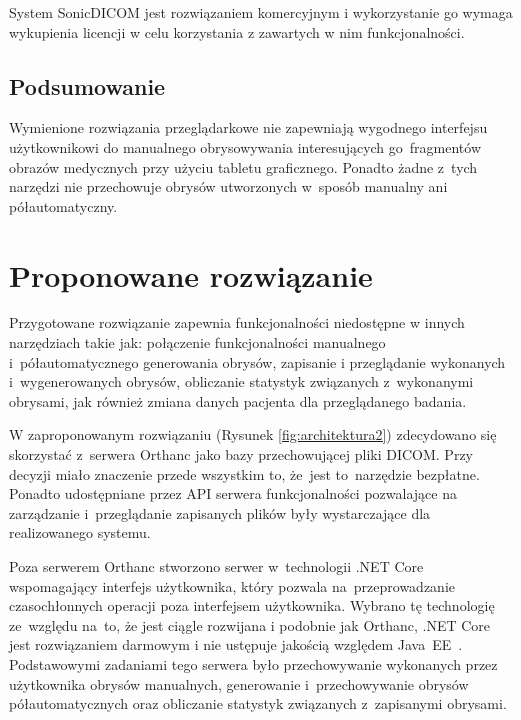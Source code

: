 \documentclass[a4paper,11pt,twoside,openright]{report}
\theoremstyle{definition}
\begin{document}
System SonicDICOM jest rozwiązaniem komercyjnym i wykorzystanie go wymaga wykupienia
licencji w celu korzystania z zawartych w nim funkcjonalności.

\subsection {Podsumowanie}

Wymienione rozwiązania przeglądarkowe nie zapewniają wygodnego interfejsu użytkownikowi
do manualnego obrysowywania interesujących go~fragmentów obrazów medycznych przy użyciu tabletu graficznego.
Ponadto żadne z~tych narzędzi nie przechowuje obrysów utworzonych w~sposób manualny
ani półautomatyczny.

\section {Proponowane rozwiązanie}

Przygotowane rozwiązanie zapewnia funkcjonalności niedostępne w innych narzędziach
takie jak: połączenie funkcjonalności manualnego i~półautomatycznego generowania obrysów,
zapisanie i przeglądanie wykonanych i~wygenerowanych obrysów,
obliczanie statystyk związanych z~wykonanymi obrysami, jak również zmiana danych pacjenta
dla przeglądanego badania.

W zaproponowanym rozwiązaniu (Rysunek \ref{fig:architektura2}) zdecydowano się skorzystać z~serwera Orthanc jako bazy przechowującej
pliki DICOM. Przy decyzji miało znaczenie przede wszystkim to, że~jest to~narzędzie
bezpłatne. Ponadto udostępniane przez API serwera funkcjonalności pozwalające na
zarządzanie i~przeglądanie zapisanych plików były wystarczające dla realizowanego systemu.

Poza serwerem Orthanc stworzono serwer w~technologii .NET Core \cite{Dotnet}
wspomagający interfejs użytkownika, który pozwala na~przeprowadzanie czasochłonnych
operacji poza interfejsem użytkownika. Wybrano tę technologię ze~względu na~to,
że jest ciągle rozwijana i podobnie jak Orthanc, .NET Core jest rozwiązaniem darmowym
i nie ustępuje jakością względem Java~EE~\cite{Dlaczego dotnet}.
Podstawowymi zadaniami tego serwera było przechowywanie
wykonanych przez użytkownika obrysów manualnych, generowanie i~przechowywanie
obrysów półautomatycznych oraz obliczanie statystyk związanych z~zapisanymi obrysami.
\end{document}

